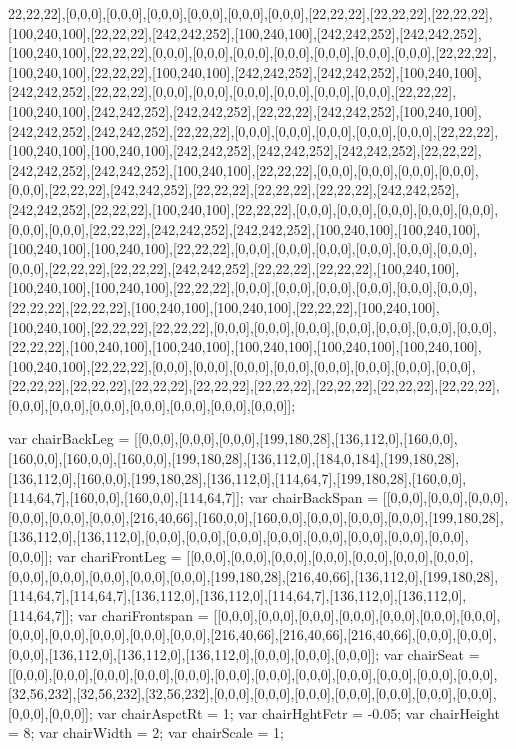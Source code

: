 22,22,22],[0,0,0],[0,0,0],[0,0,0],[0,0,0],[0,0,0],[0,0,0],[22,22,22],[22,22,22],[22,22,22],[100,240,100],[22,22,22],[242,242,252],[100,240,100],[242,242,252],[242,242,252],[100,240,100],[22,22,22],[0,0,0],[0,0,0],[0,0,0],[0,0,0],[0,0,0],[0,0,0],[0,0,0],[22,22,22],[100,240,100],[22,22,22],[100,240,100],[242,242,252],[242,242,252],[100,240,100],[242,242,252],[22,22,22],[0,0,0],[0,0,0],[0,0,0],[0,0,0],[0,0,0],[0,0,0],[22,22,22],[100,240,100],[242,242,252],[242,242,252],[22,22,22],[242,242,252],[100,240,100],[242,242,252],[242,242,252],[22,22,22],[0,0,0],[0,0,0],[0,0,0],[0,0,0],[0,0,0],[22,22,22],[100,240,100],[100,240,100],[242,242,252],[242,242,252],[242,242,252],[22,22,22],[242,242,252],[242,242,252],[100,240,100],[22,22,22],[0,0,0],[0,0,0],[0,0,0],[0,0,0],[0,0,0],[22,22,22],[242,242,252],[22,22,22],[22,22,22],[22,22,22],[242,242,252],[242,242,252],[22,22,22],[100,240,100],[22,22,22],[0,0,0],[0,0,0],[0,0,0],[0,0,0],[0,0,0],[0,0,0],[0,0,0],[22,22,22],[242,242,252],[242,242,252],[100,240,100],[100,240,100],[100,240,100],[100,240,100],[22,22,22],[0,0,0],[0,0,0],[0,0,0],[0,0,0],[0,0,0],[0,0,0],[0,0,0],[22,22,22],[22,22,22],[242,242,252],[22,22,22],[22,22,22],[100,240,100],[100,240,100],[100,240,100],[22,22,22],[0,0,0],[0,0,0],[0,0,0],[0,0,0],[0,0,0],[0,0,0],[22,22,22],[22,22,22],[100,240,100],[100,240,100],[22,22,22],[100,240,100],[100,240,100],[22,22,22],[22,22,22],[0,0,0],[0,0,0],[0,0,0],[0,0,0],[0,0,0],[0,0,0],[0,0,0],[22,22,22],[100,240,100],[100,240,100],[100,240,100],[100,240,100],[100,240,100],[100,240,100],[22,22,22],[0,0,0],[0,0,0],[0,0,0],[0,0,0],[0,0,0],[0,0,0],[0,0,0],[0,0,0],[22,22,22],[22,22,22],[22,22,22],[22,22,22],[22,22,22],[22,22,22],[22,22,22],[22,22,22],[0,0,0],[0,0,0],[0,0,0],[0,0,0],[0,0,0],[0,0,0],[0,0,0]];

var chairBackLeg = [[0,0,0],[0,0,0],[0,0,0],[199,180,28],[136,112,0],[160,0,0],[160,0,0],[160,0,0],[160,0,0],[199,180,28],[136,112,0],[184,0,184],[199,180,28],[136,112,0],[160,0,0],[199,180,28],[136,112,0],[114,64,7],[199,180,28],[160,0,0],[114,64,7],[160,0,0],[160,0,0],[114,64,7]];
var chairBackSpan  = [[0,0,0],[0,0,0],[0,0,0],[0,0,0],[0,0,0],[0,0,0],[216,40,66],[160,0,0],[160,0,0],[0,0,0],[0,0,0],[0,0,0],[199,180,28],[136,112,0],[136,112,0],[0,0,0],[0,0,0],[0,0,0],[0,0,0],[0,0,0],[0,0,0],[0,0,0],[0,0,0],[0,0,0]];
var chariFrontLeg  = [[0,0,0],[0,0,0],[0,0,0],[0,0,0],[0,0,0],[0,0,0],[0,0,0],[0,0,0],[0,0,0],[0,0,0],[0,0,0],[0,0,0],[199,180,28],[216,40,66],[136,112,0],[199,180,28],[114,64,7],[114,64,7],[136,112,0],[136,112,0],[114,64,7],[136,112,0],[136,112,0],[114,64,7]];
var chariFrontspan = [[0,0,0],[0,0,0],[0,0,0],[0,0,0],[0,0,0],[0,0,0],[0,0,0],[0,0,0],[0,0,0],[0,0,0],[0,0,0],[0,0,0],[216,40,66],[216,40,66],[216,40,66],[0,0,0],[0,0,0],[0,0,0],[136,112,0],[136,112,0],[136,112,0],[0,0,0],[0,0,0],[0,0,0]];
var chairSeat      = [[0,0,0],[0,0,0],[0,0,0],[0,0,0],[0,0,0],[0,0,0],[0,0,0],[0,0,0],[0,0,0],[0,0,0],[0,0,0],[0,0,0],[32,56,232],[32,56,232],[32,56,232],[0,0,0],[0,0,0],[0,0,0],[0,0,0],[0,0,0],[0,0,0],[0,0,0],[0,0,0],[0,0,0]];
var chairAspctRt   = 1;
var chairHghtFctr  = -0.05;
var chairHeight    = 8;
var chairWidth     = 2;
var chairScale     = 1;


